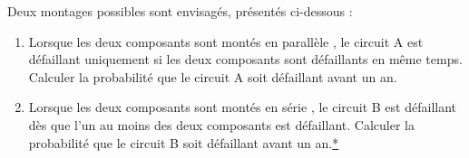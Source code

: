 \documentclass[12pt,french]{article}
\begin{document}
\begin{question}[subtitle={Antilles Guyane 2015}]
Deux montages possibles sont envisagés, présentés ci-dessous :

\begin{center}
\end{center}

\medskip

\begin{enumerate}
\item Lorsque les deux composants sont montés \og en parallèle \fg, le circuit A est défaillant
uniquement si les deux composants sont défaillants en même temps. Calculer la probabilité
que le circuit A soit défaillant avant un an.
\item Lorsque les deux composants sont montés \og en série \fg, le circuit B est défaillant dès que l'un
au moins des deux composants est défaillant. Calculer la probabilité que le circuit B soit
défaillant avant un an.\hyperlink{Index}{*}
\end{enumerate}
 

\end{question}
\end{document}
